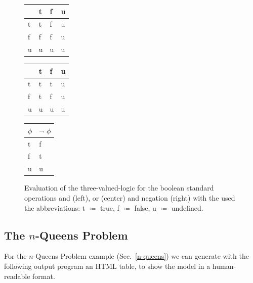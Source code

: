 \documentclass[twoside]{article}
\begin{document}
    \begin{figure}[]
    \centering
    \begin{minipage}[b]{0.35\textwidth}
        \centering
        \begin{tabular}{|l||l|l|l|}
            \hline
            \diagbox{$\phi$}{$\psi$}  & t & f & u \\ \hline \hline
                 t &  t & f &  u   \\ \hline 
                f & f  &  f & u  \\ \hline
                u &  u & u  & u  \\ \hline
        \end{tabular}
    \end{minipage}
    \begin{minipage}[b]{0.35\textwidth}
        \centering
        \begin{tabular}{|l||l|l|l|}
            \hline
            \diagbox{$\phi$}{$\psi$}  & t & f & u \\ \hline \hline
            t &  t & t &  u   \\ \hline 
            f & t  &  f & u  \\ \hline
            u &  u & u  & u  \\ \hline
        \end{tabular}
    \end{minipage}
    \begin{minipage}[b]{0.25\textwidth}
        \centering
        \begin{tabular}{|l||l|}
            \hline
            $\phi$ & $\neg$ $\phi$  \\ \hline \hline
            t & f \\ \hline
            f & t \\ \hline
            u & u \\ \hline
        \end{tabular}
    \end{minipage}
    \caption{Evaluation of the three-valued-logic for the boolean standard operations and (left), or (center) and negation (right) with the used the abbreviations: t $\coloneqq$ true, f $\coloneqq$ false, u $\coloneqq$ undefined.}
    \label{fig:three-valued-logic}
\end{figure}


\subsection{The $n$-Queens Problem}
    For the $n$-Queens Problem example (Sec.~\ref{n-queens}) we can generate with the following output program an HTML table, to show the model in a human-readable format.
    
\end{document}
